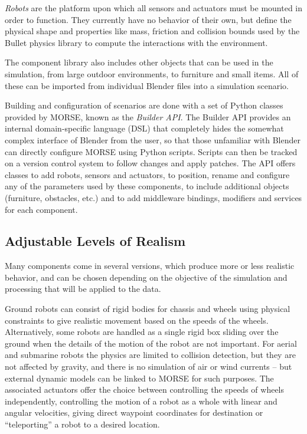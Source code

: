 \documentclass{llncs}
\begin{document}
\emph{Robots} are the platform upon which all sensors and actuators must be mounted in
order to function. They currently have no behavior of their own, but define the
physical shape and properties like mass, friction and collision bounds
used by the Bullet physics library to compute the interactions with
the environment.

The component library also includes other objects that can be used in the
simulation, from large outdoor environments, to furniture and small items.
All of these can be imported from individual Blender files into a simulation
scenario.

Building and configuration of scenarios are done with a set of Python
classes provided by MORSE, known as the \emph{Builder API}. 
The Builder API provides an internal domain-specific language (DSL) that completely
hides the somewhat complex interface of Blender from the user, so that those
unfamiliar with Blender can directly configure MORSE using Python scripts.
Scripts can then be tracked on a version control system to follow changes and
apply patches.
The API offers classes to add robots, sensors and actuators, to position,
rename and configure any of the parameters used by these components, to
include additional objects (furniture, obstacles, etc.) and to add middleware
bindings, modifiers and services for each component.

\subsection{Adjustable Levels of Realism}
\label{section:realism}

Many components come in several versions, which produce more or less
realistic behavior, and can be chosen depending on the objective of the
simulation and processing that will be applied to the data.

Ground robots can consist of rigid bodies for chassis and wheels using physical
constraints to give realistic movement based on the speeds of the
wheels. Alternatively, some robots are handled as a single rigid box sliding
over the ground when the details of the motion of the robot are not
important. For aerial and submarine robots the physics are limited to collision
detection, but they are not affected by gravity, and there is no simulation of
air or wind currents -- but external dynamic models can be linked to MORSE for
such purposes. The associated actuators offer the choice between controlling
the speeds of wheels independently, controlling the motion of a robot as a whole
with linear and angular velocities, giving direct waypoint coordinates for
destination or ``teleporting'' a robot to a desired location.
\end{document}
